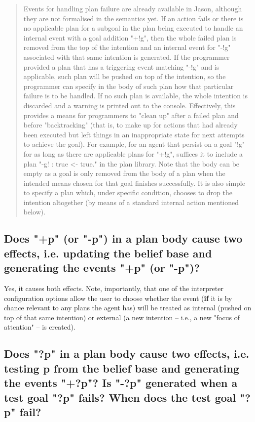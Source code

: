 \documentclass{article}
\begin{document}
\begin{description}
\begin{quote}
  Events for handling plan failure are already available in Jason,
  although they are not formalised in the semantics yet. If an action
  fails or there is no applicable plan for a subgoal in the plan being
  executed to handle an internal event with a goal addition "+!g",
  then the whole failed plan is removed from the top of the intention
  and an internal event for "-!g" associated with that same intention
  is generated. If the programmer provided a plan that has a
  triggering event matching "-!g" and is applicable, such plan will be
  pushed on top of the intention, so the programmer can specify in the
  body of such plan how that particular failure is to be handled. If
  no such plan is available, the whole intention is discarded and a
  warning is printed out to the console. Effectively, this provides a
  means for programmers to "clean up" after a failed plan and before
  "backtracking" (that is, to make up for actions that had already
  been executed but left things in an inappropriate state for next
  attempts to achieve the goal). For example, for an agent that
  persist on a goal "!g" for as long as there are applicable plans for
  "+!g", suffices it to include a plan "-g! : true <- true." in the
  plan library. Note that the body can be empty as a goal is only
  removed from the body of a plan when the intended means chosen for
  that goal finishes successfully. It is also simple to specify a plan
  which, under specific condition, chooses to drop the intention
  altogether (by means of a standard internal action mentioned below).
\end{quote}

\subsection{Does "+p" (or "-p") in a plan body cause two effects,
  i.e. updating the belief base and generating the events "+p" (or "-p")?}

Yes, it causes both effects. Note, importantly, that one of the
interpreter configuration options allow the user to choose whether the
event (\textbf{if} it is by chance relevant to any plans the agent
has) will be treated as internal (pushed on top of that same
intention) or external (a new intention -- i.e., a new "focus of
attention" -- is created).

\subsection{Does "?p" in a plan body cause two effects, i.e. testing p
from the belief base and generating the events "+?p"? Is "-?p"
  generated when a test goal "?p" fails? When does the test goal
  "?p" fail?}


\end{description}
\end{document}
